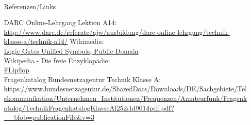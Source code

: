 \renewcommand{\refname}{Referenzen}

\hypertarget{refs}{}
\textcolor{white}{} \\ %
\Large Referenzen/Links
\footnotesize

\begin{thebibliography}{}
    DARC Online-Lehrgang Lektion A14:\\
    \url{http://www.darc.de/referate/ajw/ausbildung/darc-online-lehrgang/technik-klasse-a/technik-a14/}
   	Wikimedia:\\
    \href{https://commons.wikimedia.org/wiki/Logic_gates_unified_symbols}{Logic Gates Unified Symbols, Public Domain}\\
      Wikipedia - Die freie Enzyklopädie:\\
    \href{https://de.wikipedia.org/wiki/Flipflop}{FLipflop}\\
     Fragenkatalog Bundesnetzagentur Technik Klasse A:\\
    \url{https://www.bundesnetzagentur.de/SharedDocs/Downloads/DE/Sachgebiete/Telekommunikation/Unternehmen_Institutionen/Frequenzen/Amateurfunk/Fragenkatalog/TechnikFragenkatalogKlasseAf252rId9014pdf.pdf?__blob=publicationFile&v=3}
\end{thebibliography}


